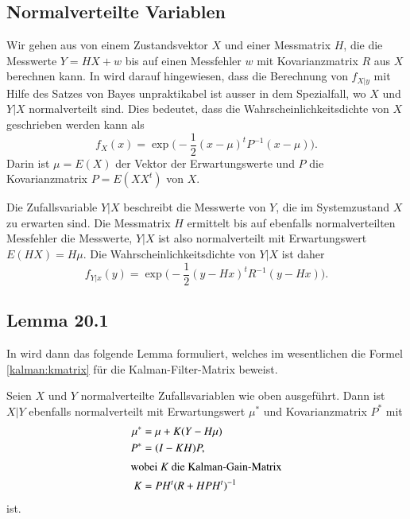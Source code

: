 \subsection{Normalverteilte Variablen\label{subsection:bayesian:normalverteilt}}
Wir gehen aus von einem Zustandsvektor $X$ und einer Messmatrix $H$,
die die Messwerte $Y=HX + w$ bis auf einen Messfehler $w$ mit
Kovarianzmatrix $R$ aus $X$ berechnen kann.
In \cite{skript:kaperengler} wird darauf hingewiesen, dass die Berechnung
von $f_{X|y}$ mit Hilfe des Satzes von Bayes 
unpraktikabel ist ausser in dem Spezialfall, wo $X$ und $Y|X$ 
normalverteilt sind.
Dies bedeutet, dass die Wahrscheinlichkeitsdichte von $X$ geschrieben
werden kann als
\begin{equation}
f_X(x) = \exp\biggl(
-\frac12 (x-\mu)^t P^{-1} (x-\mu)
\biggr).
\label{xverteilung}
\end{equation}
Darin ist $\mu=E(X)$ der Vektor der Erwartungswerte und $P$ die
Kovarianzmatrix $P=E(XX^t)$ von $X$.

Die Zufallsvariable $Y|X$ beschreibt die Messwerte von $Y$, die im
Systemzustand $X$ zu erwarten sind.
Die Messmatrix $H$ ermittelt bis auf ebenfalls normalverteilten
Messfehler die Messwerte, $Y|X$ ist also normalverteilt mit
Erwartungswert $E(HX)=H\mu$.
Die Wahrscheinlichkeitsdichte von $Y|X$ ist daher
\begin{equation}
f_{Y|x}(y)
=
\exp\biggl(-\frac12
(y-Hx)^tR^{-1}(y-Hx)
\biggr).
\label{yverteilung}
\end{equation}

\subsection{Lemma 20.1\label{subsection:lemma 20.1}}
In \cite{skript:kaperengler} wird dann das folgende Lemma formuliert,
welches im wesentlichen die Formel \eqref{kalman:kmatrix} für die
Kalman-Filter-Matrix beweist.

\begin{lemma*}
Seien $X$ und $Y$ normalverteilte Zufallsvariablen wie oben ausgeführt.
Dann ist $X|Y$ ebenfalls normalverteilt mit
Erwartungswert $\mu^*$ und Kovarianzmatrix $P^*$ mit
\begin{align}
\mu^*
&=
\mu + K(Y - H\mu)
\label{mustern}
\\
P^*
&=
(I-KH)P,
\label{Pstern}
\\
\intertext{wobei $K$ die Kalman-Gain-Matrix}
K
&=
PH^t(R+HPH^t)^{-1}
\label{kalman-formel}
\end{align}
ist.
\end{lemma*}

